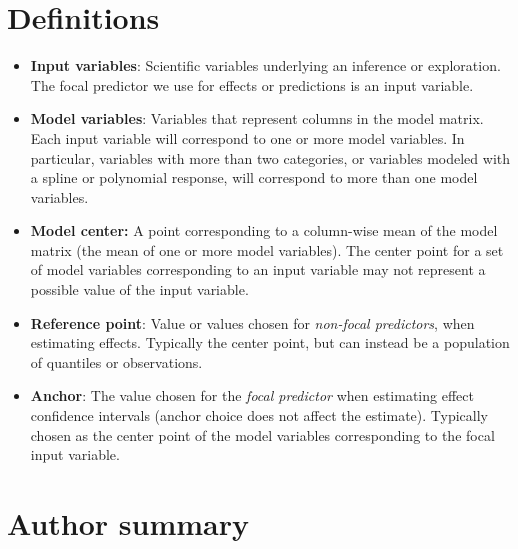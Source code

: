 \section*{Definitions}

\begin{itemize}
\item \textbf{Input variables}: Scientific variables underlying an inference or exploration. The focal predictor we use for effects or predictions is an input variable.
\item \textbf{Model variables}: Variables that represent columns in the model matrix. Each input variable will correspond to one or more model variables. In particular, variables with more than two categories, or variables modeled with a spline or polynomial response, will correspond to more than one model variables.
\item\textbf{Model center:} A point corresponding to a column-wise mean of the model matrix (the mean of one or more model variables). The center point for a set of model variables corresponding to an input variable may not represent a possible value of the input variable.
\item \textbf{Reference point}: Value or values chosen for \emph{non-focal predictors}, when estimating effects. Typically the center point, but can instead be a population of quantiles or observations. 
\item \textbf{Anchor}: The value chosen for the \emph{focal predictor} when estimating effect confidence intervals (anchor choice does not affect the estimate). Typically chosen as the center point of the model variables corresponding to the focal input variable.
\end{itemize}

\section*{Author summary}

\fix
